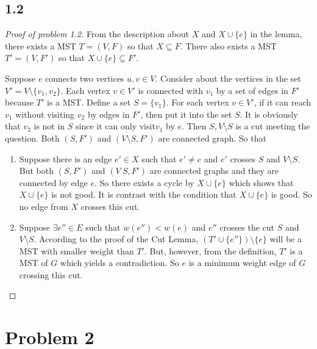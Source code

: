 \documentclass[paper=a4, fontsize=11pt]{scrartcl} %
\numberwithin{figure}{section} %
\numberwithin{table}{section} %
\begin{document}
\subsection*{1.2}
\begin{proof}[Proof of problem 1.2]
    From the description about $X$ and $X \cup \{e\}$ in the lemma, there exists a MST $T = (V, F)$ so that $X \subseteq F$. There also exists a MST $T' = (V, F')$ so that $X \cup \{e\} \subseteq F'$.
    
    Suppose $e$ connects two vertices $u, v \in V$. Consider about the vertices in the set $V'= V \setminus \{v_1, v_2\}$. Each vertex $v \in V'$ is connected with $v_1$ by a set of edges in $F'$ because $T'$ is a MST. Define a set $S = \{v_1\}$. For each vertex $v \in V'$, if it can reach $v_1$ without visiting $v_2$ by edges in $F'$, then put it into the set $S$. It is obviously that $v_2$ is not in $S$ since it can only visit$v_1$ by $e$. Then $S, V\setminus S$ is a cut meeting the question. Both $(S, F')$ and $(V \setminus S, F')$ are connected graph. So that
    \begin{enumerate}
        \item Suppose there is an edge $e' \in X$ such that $e' \neq e$ and $e'$ crosses $S$ and $V \setminus S$. But both $(S, F')$ and $(V \ S, F')$ are connected graphs and they are connected by edge $e$. So there exists a cycle by $X \cup \{e\}$ which shows that $X \cup \{e\}$ is not good. It is contrast with the condition that $X \cup \{e\}$ is good. So no edge from $X$ crosses this cut.

        \item Suppose $\exists e'' \in E$ such that $w(e'') < w(e)$ and $e''$ crosses the cut $S$ and $V \setminus S$. According to the proof of the Cut Lemma, $(T' \cup \{e''\})\setminus \{e\}$ will be a MST with smaller weight than $T'$. But, however, from the definition, $T'$ is a MST of $G$ which yields a contradiction. So $e$ is a minimum weight edge of $G$ crossing this cut.
    \end{enumerate}
\end{proof}



\section*{Problem 2}
\end{document}
